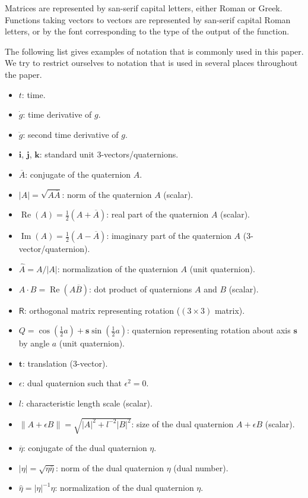 \documentclass[reqno,12pt]{amsart}
\newcommand\bi{\bm i}
\newcommand\bj{\bm j}
\newcommand\bk{\bm k}
\DeclareMathOperator\realpart{Re}
\DeclareMathOperator\imagpart{Im}
\begin{document}
Matrices are represented by san-serif capital letters, either Roman or Greek.  Functions taking vectors to vectors are represented by san-serif capital Roman letters, or by the font corresponding to the type of the output of the function.

The following list gives examples of notation that is commonly used in this paper.  We try to restrict ourselves to notation that is used in several places throughout the paper.

\begin{itemize}
\item $t$: time.
\item $\dot g$: time derivative of $g$.
\item $\ddot g$: second time derivative of $g$.
\item $\bi$, $\bj$, $\bk$: standard unit 3-vectors/quaternions.
\item $\overline A$: conjugate of the quaternion $A$.
\item $|A| = \sqrt{A\overline A}$: norm of the quaternion $A$ (scalar).
\item $\realpart(A) = \tfrac12(A + \overline A)$: real part of the quaternion $A$ (scalar).
\item $\imagpart(A) = \tfrac12(A - \overline A)$: imaginary part of the quaternion $A$ (3-vector/quaternion).
\item $\widehat{A} = A/|A|$: normalization of the quaternion $A$ (unit quaternion).
\item $A \cdot B = \realpart(A \overline B)$: dot product of quaternions $A$ and $B$ (scalar).
\item $\mathsf R$: orthogonal matrix representing rotation ($(3 \times 3)$ matrix).
\item $Q = \cos(\tfrac12 a) + \bm s \sin(\tfrac12 a)$: quaternion representing rotation about axis $\bm s$ by angle $a$ (unit quaternion).
\item $\bm t$: translation (3-vector).
\item $\epsilon$: dual quaternion such that $\epsilon^2 = 0$.
\item $l$: characteristic length scale (scalar).
\item $\|A + \epsilon B\| = \sqrt{|A|^2 + l^{-2} |B|^2}$: size of the dual quaternion $A + \epsilon B$ (scalar).
\item $\overline\eta$: conjugate of the dual quaternion $\eta$.
\item $|\eta| = \sqrt{\eta\overline\eta}$: norm of the dual quaternion $\eta$ (dual number).
\item $\widehat\eta = |\eta|^{-1} \eta$: normalization of the dual quaternion $\eta$.

\end{itemize}
\end{document}
